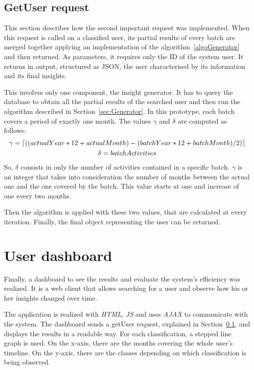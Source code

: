 \subsection{GetUser request}
\label{sec:getUserReq}
This section describes how the second important request was implemented.
When this request is called on a classified user, its partial results of every batch are merged together applying an implementation of the algorithm~\ref{algoGenerator} and then returned.
As parameters, it requires only the ID of the system user. It returns in output, structured as JSON, the user characterised by its information and its final insights.

This involves only one component, the insight generator. It has to query the database to obtain all the partial results of the searched user and then run the algorithm described in Section~\ref{sec:Generator}.
In this prototype, each batch covers a period of exactly one month. 
The values $\gamma$ and $\delta$ are computed as follows:
\begin{gather}
\label{gamma}
\gamma = \left\lceil ((actualYear*12 + actualMonth) - (batchYear*12 + batchMonth)/2) \right\rceil \\
\delta = batchActivities
\end{gather}
So, $\delta$ consists in only the number of activities contained in a specific batch. 
$\gamma$ is an integer that takes into consideration the number of months between the actual one and the one covered by the batch. This value starts at one and increase of one every two months.

Then the algorithm is applied with these two values, that are calculated at every iteration.
Finally, the final object representing the user can be returned.


\section{User dashboard}
\label{sec:userDash}
Finally, a dashboard to see the results and evaluate the system's efficiency was realized.
It is a web client that allows searching for a user and observe how his or her insights changed over time.

The application is realized with \textit{HTML}, \textit{JS} and uses \textit{AJAX} to communicate with the system.
The dashboard sends a getUser request, explained in Section~\ref{sec:getUserReq}, and displays the results in a readable way.
For each classification, a stepped line graph is used. On the x-axis, there are the months covering the whole user's timeline.
On the y-axis, there are the classes depending on which classification is being observed.


